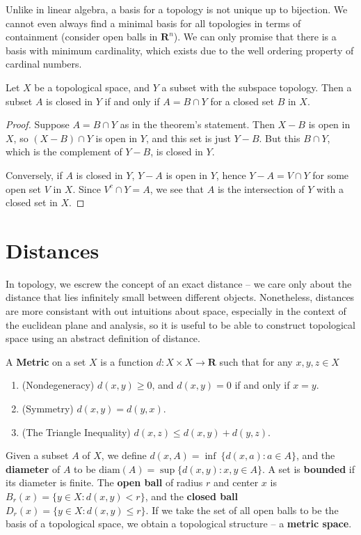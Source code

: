Unlike in linear algebra, a basis for a topology is not unique up to bijection. We cannot even always find a minimal basis for all topologies in terms of containment (consider open balls in $\mathbf{R}^n$). We can only promise that there is a basis with minimum cardinality, which exists due to the well ordering property of cardinal numbers.

\begin{theorem}
    Let $X$ be a topological space, and $Y$ a subset with the subspace topology. Then a subset $A$ is closed in $Y$ if and only if $A = B \cap Y$ for a closed set $B$ in $X$.
\end{theorem}
\begin{proof}
    Suppose $A = B \cap Y$ as in the theorem's statement. Then $X - B$ is open in $X$, so $(X - B) \cap Y$ is open in $Y$, and this set is just $Y - B$. But this $B \cap Y$, which is the complement of $Y - B$, is closed in $Y$.

    Conversely, if $A$ is closed in $Y$, $Y - A$ is open in $Y$, hence $Y - A = V \cap Y$ for some open set $V$ in $X$. Since $V^c \cap Y = A$, we see that $A$ is the intersection of $Y$ with a closed set in $X$.
\end{proof}




\chapter{Distances}

In topology, we escrew the concept of an exact distance -- we care only about the distance that lies infinitely small between different objects. Nonetheless, distances are more consistant with out intuitions about space, especially in the context of the euclidean plane and analysis, so it is useful to be able to construct topological space using an abstract definition of distance.

\begin{definition}
    A {\bf Metric} on a set $X$ is a function $d: X \times X \to \mathbf{R}$ such that for any $x,y,z \in X$
    \begin{enumerate}
        \item (Nondegeneracy) $d(x,y) \geq 0$, and $d(x,y) = 0$ if and only if $x = y$.
        \item (Symmetry) $d(x,y) = d(y,x)$.
        \item (The Triangle Inequality) $d(x,z) \leq d(x,y) + d(y,z)$.
    \end{enumerate}
    Given a subset $A$ of $X$, we define $d(x,A) = \inf\ \{ d(x,a) : a \in A \}$, and the {\bf diameter} of $A$ to be $\text{diam}(A) = \sup \{ d(x,y) : x,y \in A \}$. A set is {\bf bounded} if its diameter is finite. The {\bf open ball} of radius $r$ and center $x$ is $B_r(x) = \{ y \in X : d(x,y) < r \}$, and the {\bf closed ball} $D_r(x) = \{ y \in X : d(x,y) \leq r \}$. If we take the set of all open balls to be the basis of a topological space, we obtain a topological structure -- a {\bf metric space}.
\end{definition}

